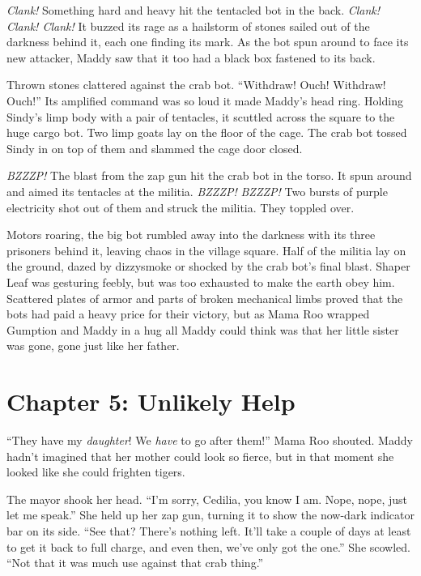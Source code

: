 \documentclass[10pt]{article}
\begin{document}
\emph{Clank!} Something hard and heavy hit the tentacled bot in the
back. \emph{Clank! Clank! Clank!} It buzzed its rage as a hailstorm of
stones sailed out of the darkness behind it, each one finding its mark.
As the bot spun around to face its new attacker, Maddy saw that it too
had a black box fastened to its back.

Thrown stones clattered against the crab bot. ``Withdraw! Ouch!
Withdraw! Ouch!'' Its amplified command was so loud it made Maddy's head
ring. Holding Sindy's limp body with a pair of tentacles, it scuttled
across the square to the huge cargo bot. Two limp goats lay on the floor
of the cage. The crab bot tossed Sindy in on top of them and slammed the
cage door closed.

\emph{BZZZP!} The blast from the zap gun hit the crab bot in the torso.
It spun around and aimed its tentacles at the militia. \emph{BZZZP!}
\emph{BZZZP!} Two bursts of purple electricity shot out of them and
struck the militia. They toppled over.

Motors roaring, the big bot rumbled away into the darkness with its
three prisoners behind it, leaving chaos in the village square. Half of
the militia lay on the ground, dazed by dizzysmoke or shocked by the
crab bot's final blast. Shaper Leaf was gesturing feebly, but was too
exhausted to make the earth obey him. Scattered plates of armor and
parts of broken mechanical limbs proved that the bots had paid a heavy
price for their victory, but as Mama Roo wrapped Gumption and Maddy in a
hug all Maddy could think was that her little sister was gone, gone just
like her father.

\newpage
\section{Chapter 5: Unlikely Help}

``They have my \emph{daughter}! We \emph{have} to go after them!'' Mama
Roo shouted. Maddy hadn't imagined that her mother could look so fierce,
but in that moment she looked like she could frighten tigers.

The mayor shook her head. ``I'm sorry, Cedilia, you know I am. Nope,
nope, just let me speak.'' She held up her zap gun, turning it to show
the now-dark indicator bar on its side. ``See that? There's nothing
left. It'll take a couple of days at least to get it back to full
charge, and even then, we've only got the one.'' She scowled. ``Not that
it was much use against that crab thing.''
\end{document}
